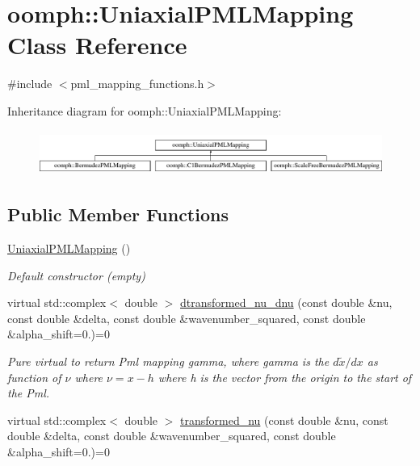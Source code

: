 \hypertarget{classoomph_1_1UniaxialPMLMapping}{}\section{oomph\+:\+:Uniaxial\+P\+M\+L\+Mapping Class Reference}
\label{classoomph_1_1UniaxialPMLMapping}


{\ttfamily \#include $<$pml\+\_\+mapping\+\_\+functions.\+h$>$}

Inheritance diagram for oomph\+:\+:Uniaxial\+P\+M\+L\+Mapping\+:\begin{figure}[H]
\begin{center}
\leavevmode
\includegraphics[height=1.475626cm]{classoomph_1_1UniaxialPMLMapping}
\end{center}
\end{figure}
\subsection*{Public Member Functions}
\begin{DoxyCompactItemize}
\item 
\hyperlink{classoomph_1_1UniaxialPMLMapping_a95ac1c46c68f6f74f75901054d36213b}{Uniaxial\+P\+M\+L\+Mapping} ()
\begin{DoxyCompactList}\small\item\em Default constructor (empty) \end{DoxyCompactList}\item 
virtual std\+::complex$<$ double $>$ \hyperlink{classoomph_1_1UniaxialPMLMapping_a2062b54207f13512fd3d9b901c882d44}{dtransformed\+\_\+nu\+\_\+dnu} (const double \&nu, const double \&delta, const double \&wavenumber\+\_\+squared, const double \&alpha\+\_\+shift=0.)=0
\begin{DoxyCompactList}\small\item\em Pure virtual to return Pml mapping gamma, where gamma is the $d\tilde x / d x$ as function of $\nu$ where $\nu = x - h$ where h is the vector from the origin to the start of the Pml. \end{DoxyCompactList}\item 
virtual std\+::complex$<$ double $>$ \hyperlink{classoomph_1_1UniaxialPMLMapping_ae4a0c65e90fe4b90d2ff00b193798588}{transformed\+\_\+nu} (const double \&nu, const double \&delta, const double \&wavenumber\+\_\+squared, const double \&alpha\+\_\+shift=0.)=0
\end{DoxyCompactItemize}


